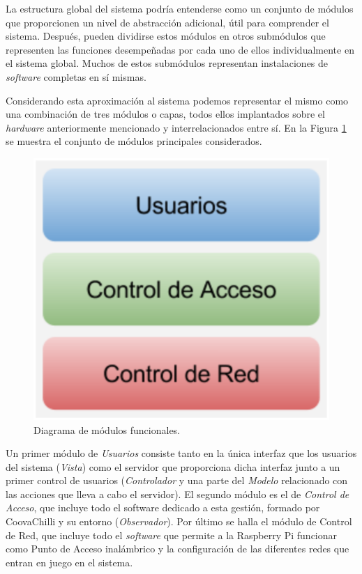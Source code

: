La estructura global del sistema podría entenderse como un conjunto de módulos que proporcionen un nivel de abstracción adicional, útil para comprender el sistema. Después, pueden dividirse estos módulos en otros submódulos que representen las funciones desempeñadas por cada uno de ellos individualmente en el sistema global. Muchos de estos submódulos representan instalaciones de \emph{software} completas en sí mismas.

Considerando esta aproximación al sistema podemos representar el mismo como una combinación de tres módulos o capas, todos ellos implantados sobre el \emph{hardware} anteriormente mencionado y interrelacionados entre sí. En la Figura \ref{modulos} se muestra el conjunto de módulos principales considerados.

\begin{figure}[!t]
\begin{center}
\includegraphics[width=0.75\linewidth]{./4_AnalisisFuncional/Img/modulos.png}
\end{center}
\caption{Diagrama de módulos funcionales.}
\label{modulos}
\end{figure}

Un primer módulo de \emph{Usuarios} consiste tanto en la única interfaz que los usuarios del sistema (\emph{Vista}) como el servidor que proporciona dicha interfaz junto a un primer control de usuarios (\emph{Controlador} y una parte del \emph{Modelo} relacionado con las acciones que lleva a cabo el servidor). El segundo módulo es el de \emph{Control de Acceso}, que incluye todo el software dedicado a esta gestión, formado por CoovaChilli y su entorno (\emph{Observador}). Por último se halla el módulo de Control de Red, que incluye todo el \emph{software} que permite a la Raspberry Pi funcionar como Punto de Acceso inalámbrico y la configuración de las diferentes redes que entran en juego en el sistema.

